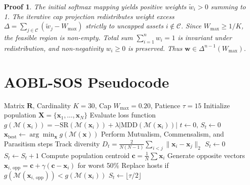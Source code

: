\documentclass[11pt,a4paper]{article}
\newtheorem{proof_prop}{Proof}
\begin{document}
\begin{proof_prop}
The initial softmax mapping yields positive weights $\tilde{w}_i > 0$ summing to 1. The iterative cap projection redistributes weight excess $\Delta = \sum_{j \in \mathcal{C}} (\tilde{w}_j - W_{\max})$ strictly to uncapped assets $i \notin \mathcal{C}$. Since $W_{\max} \ge 1/K$, the feasible region is non-empty. Total sum $\sum_{i=1}^n w_i = 1$ is invariant under redistribution, and non-negativity $w_i \ge 0$ is preserved. Thus $\mathbf{w} \in \Delta^{n-1}(W_{\max})$.
\end{proof_prop}

\section{AOBL-SOS Pseudocode}

\begin{algorithm}
\caption{AOBL-SOS Institutional Portfolio Optimization}\label{alg:aobl_sos}
\begin{algorithmic}[1]
\Require Matrix $\mathbf{R}$, Cardinality $K=30$, Cap $W_{\max}=0.20$, Patience $\tau=15$
\State Initialize population $\mathbf{X} = \{\mathbf{x}_1, \dots, \mathbf{x}_N\}$
\State Evaluate loss function $g(\mathcal{M}(\mathbf{x}_i)) = -\text{SR}(\mathcal{M}(\mathbf{x}_i)) + \lambda |\text{MDD}(\mathcal{M}(\mathbf{x}_i))|$
\State $t \gets 0, \, S_t \gets 0$
    \State $\mathbf{x}_{\text{best}} \gets \arg\min_{\mathbf{x}} g(\mathcal{M}(\mathbf{x}))$
        \State Perform Mutualism, Commensalism, and Parasitism steps
    \EndFor
    \State Track diversity $D_t = \frac{2}{N(N-1)} \sum_{i < j} \|\mathbf{x}_i - \mathbf{x}_j\|_2$
        \State $S_t \gets 0$
    \Else
        \State $S_t \gets S_t + 1$
    \EndIf
        \State Compute population centroid $\mathbf{c} = \frac{1}{N}\sum \mathbf{x}_i$
        \State Generate opposite vectors $\mathbf{x}_{i, \, \text{opp}} = \mathbf{c} + \gamma(\mathbf{c} - \mathbf{x}_i)$ for worst 50\%
        \State Replace hosts if $g(\mathcal{M}(\mathbf{x}_{i, \, \text{opp}})) < g(\mathcal{M}(\mathbf{x}_i))$
        \State $S_t \gets \lfloor \tau / 2 \rfloor$
    \EndIf
\EndWhile
\end{algorithmic}
\end{algorithm}
\end{document}
